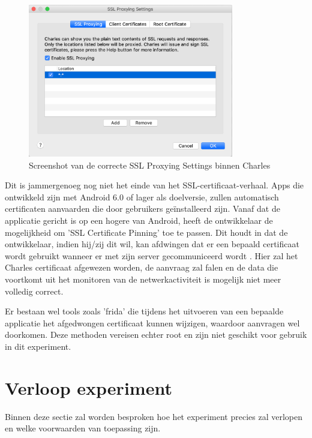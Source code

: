 \begin{figure}
    \centering
    \includegraphics[width=0.8\textwidth]{img/charlessslsettings.png}
    \caption{Screenshot van de correcte SSL Proxying Settings binnen Charles}
    \label{fig:charlessslsettings}
\end{figure}

Dit is jammergenoeg nog niet het einde van het SSL-certificaat-verhaal. Apps die ontwikkeld zijn met Android 6.0 of lager als doelversie, zullen automatisch certificaten aanvaarden die door gebruikers geïnstalleerd zijn. Vanaf dat de applicatie gericht is op een hogere van Android, heeft de ontwikkelaar de mogelijkheid om 'SSL Certificate Pinning' toe te passen. Dit houdt in dat de ontwikkelaar, indien hij/zij dit wil, kan afdwingen dat er een bepaald certificaat wordt gebruikt wanneer er met zijn server gecommuniceerd wordt \autocite{wass_ssl-pinning}. Hier zal het Charles certificaat afgewezen worden, de aanvraag zal falen en de data die voortkomt uit het monitoren van de netwerkactiviteit is mogelijk niet meer volledig correct.

Er bestaan wel tools zoals 'frida' die tijdens het uitvoeren van een bepaalde applicatie het afgedwongen certificaat kunnen wijzigen, waardoor aanvragen wel doorkomen. Deze methoden vereisen echter root en zijn niet geschikt voor gebruik in dit experiment.


\section{Verloop experiment}
\label{sec:conditionsexperiment}
Binnen deze sectie zal worden besproken hoe het experiment precies zal verlopen en welke voorwaarden van toepassing zijn.

